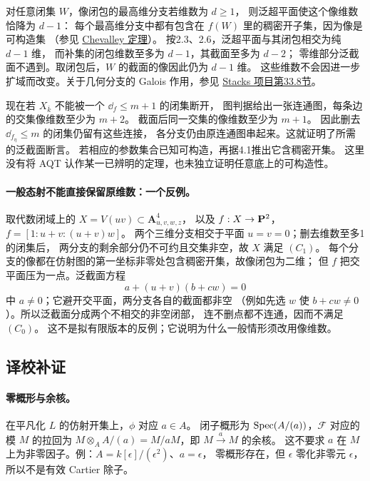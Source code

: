 对任意闭集 $W$，像闭包的最高维分支若维数为 $d\geq1$，
则泛超平面使这个像维数恰降为 $d-1$：
每个最高维分支中都有包含在 $f(W)$ 里的稠密开子集，因为像是可构造集
（参见 \href{https://stacks.math.columbia.edu/tag/054K}{Chevalley 定理}）。
按2.3、2.6，泛超平面与其闭包相交为纯 $d-1$ 维，
而补集的闭包维数至多为 $d-1$，其截面至多为 $d-2$；
零维部分泛截面不遇到。取闭包后，$W$ 的截面的像因此仍为 $d-1$ 维。
这些维数不会因进一步扩域而改变。关于几何分支的 Galois 作用，参见
\href{https://stacks.math.columbia.edu/tag/0364}{Stacks 项目第33.8节}。

现在若 $X_{\overline k}$ 不能被一个 $\dd_f\leq m+1$ 的闭集断开，
图判据给出一张连通图，每条边的交集像维数至少为 $m+2$。
截面后同一交集的像维数至少为 $m+1$。
因此删去 $\dd_{f_\eta}\leq m$ 的闭集仍留有这些连接，
各分支仍由原连通图串起来。这就证明了所需的泛截面断言。
若相应的参数集合已知可构造，再据4.1推出它含稠密开集。
这里没有将 AQT 认作某一已辨明的定理，也未独立证明任意底上的可构造性。

\paragraph{一般态射不能直接保留原维数：一个反例。}
取代数闭域上的 $X=V(uv)\subset\mathbf A^4_{u,v,w,z}$，
以及 $f:X\to\PP^2$，$f=[1:u+v:(u+v)w]$。
两个三维分支相交于平面 $u=v=0$；删去维数至多1的闭集后，
两分支的剩余部分仍不可约且交集非空，故 $X$ 满足 $(C_1)$。
每个分支的像都在仿射图的第一坐标非零处包含稠密开集，故像闭包为二维；
但 $f$ 把交平面压为一点。泛截面方程
\[
 a+(u+v)(b+cw)=0
\]
中 $a\ne0$；它避开交平面，两分支各自的截面都非空
（例如先选 $w$ 使 $b+cw\ne0$）。所以泛截面分成两个不相交的非空闭部，
连不删点都不连通，因而不满足 $(C_0)$。
这不是拟有限版本的反例；它说明为什么一般情形须改用像维数。

\endgroup


\hypertarget{D18-094-notes}{}
\begingroup
\def\OO{\mathcal O}\def\FF{\mathcal F}\def\GG{\mathcal G}
\def\PP{\mathbf P}\def\calP{\mathcal P}\def\dd{\delta}
\def\Div{\operatorname{Div}}\def\depth{\operatorname{depth}}
\def\pr{\operatorname{pr}}\def\coker{\operatorname{coker}}
\subsection*{译校补证}
\paragraph{零概形与余核。}
在平凡化 $L$ 的仿射开集上，$\phi$ 对应 $a\in A$。
闭子概形为 $\operatorname{Spec}(A/(a))$，$\FF$ 对应的模 $M$ 的拉回为
$M\otimes_A A/(a)=M/aM$，即 $M\xrightarrow{a} M$ 的余核。
这不要求 $a$ 在 $M$ 上为非零因子。例：$A=k[\epsilon]/(\epsilon^2)$、$a=\epsilon$，
零概形存在，但 $\epsilon$ 零化非零元 $\epsilon$，所以不是有效 Cartier 除子。

